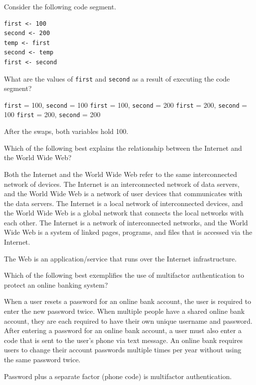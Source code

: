 \question[5]
Consider the following code segment.
\begin{lstlisting}[style=pseudo]
first <- 100
second <- 200
temp <- first
second <- temp
first <- second
\end{lstlisting}
What are the values of \texttt{first} and \texttt{second} as a result of executing the code segment?
\begin{choices}
  \CorrectChoice \texttt{first} = 100, \texttt{second} = 100
  \choice \texttt{first} = 100, \texttt{second} = 200
  \choice \texttt{first} = 200, \texttt{second} = 100
  \choice \texttt{first} = 200, \texttt{second} = 200
\end{choices}
\begin{solution}
  After the swaps, both variables hold 100.
\end{solution}



\newpage



\question[5]
Which of the following best explains the relationship between the Internet and the World Wide Web?
\begin{choices}
  \choice Both the Internet and the World Wide Web refer to the same interconnected network of devices.
  \choice The Internet is an interconnected network of data servers, and the World Wide Web is a network of user devices that communicates with the data servers.
  \choice The Internet is a local network of interconnected devices, and the World Wide Web is a global network that connects the local networks with each other.
  \CorrectChoice The Internet is a network of interconnected networks, and the World Wide Web is a system of linked pages, programs, and files that is accessed via the Internet.
\end{choices}
\begin{solution}
  The Web is an application/service that runs over the Internet infrastructure.
\end{solution}

\question[5]
Which of the following best exemplifies the use of multifactor authentication to protect an online banking system?
\begin{choices}
  \choice When a user resets a password for an online bank account, the user is required to enter the new password twice.
  \choice When multiple people have a shared online bank account, they are each required to have their own unique username and password.
  \CorrectChoice After entering a password for an online bank account, a user must also enter a code that is sent to the user's phone via text message.
  \choice An online bank requires users to change their account passwords multiple times per year without using the same password twice.
\end{choices}
\begin{solution}
  Password plus a separate factor (phone code) is multifactor authentication.
\end{solution}



